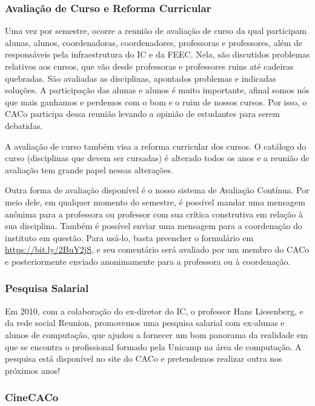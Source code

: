 \subsubsection{Avaliação de Curso e Reforma Curricular}

Uma vez por semestre, ocorre a reunião de avaliação de curso da qual participam
alunas, alunos, coordenadoras, coordenadores, professoras e professores, além
de responsáveis pela infraestrutura do IC e da FEEC. Nela, são discutidos
problemas relativos aos cursos, que vão desde professoras e professores ruins
até cadeiras quebradas. São avaliadas as disciplinas, apontados problemas e
indicadas soluções. A participação das alunas e alunos é muito importante,
afinal somos nós que mais ganhamos e perdemos com o bom e o ruim de nossos
cursos. Por isso, o CACo participa dessa reunião levando a opinião de
estudantes para serem debatidas.

A avaliação de curso também visa a reforma curricular dos cursos. O catálogo do
curso (disciplinas que devem ser cursadas) é alterado todos os anos e a reunião
de avaliação tem grande papel nessas alterações.

Outra forma de avaliação disponível é o nosso sistema de Avaliação Contínua. 
Por meio dele, em qualquer momento do semestre, é possível mandar uma mensagem 
anônima para a professora ou professor com sua crítica construtiva em relação à 
sua disciplina. Também é possível enviar uma mensagem para a coordenação do 
instituto em questão. Para usá-lo, basta preencher o formulário em 
\url{https://bit.ly/2BuY2jS}, e seu comentário será avaliado por um membro do 
CACo e posteriormente enviado anonimamente para a professora ou à coordenação.

\subsubsection{Pesquisa Salarial}

Em 2010, com a colaboração do ex-diretor do IC, o professor Hans Liesenberg, e
da rede social Reunion, promovemos uma pesquisa salarial com ex-alunas e alunos
de computação, que ajudou a fornecer um bom panorama da realidade em que se
encontra o profissional formado pela Unicamp na área de computação. A pesquisa
está disponível no site do CACo e pretendemos realizar outra nos próximos anos!

\subsubsection{CineCACo}

